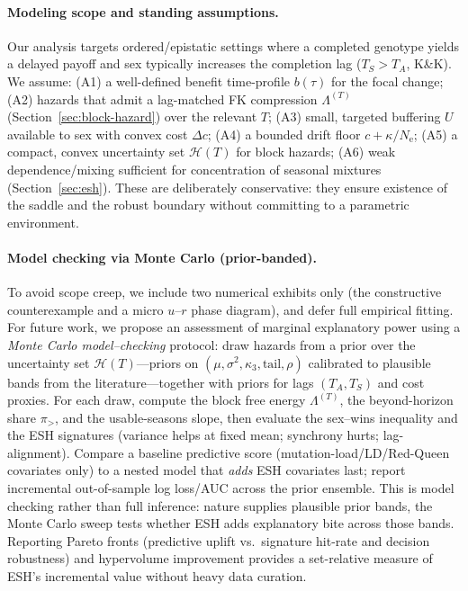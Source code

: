 \documentclass[11pt]{article}
\theoremstyle{upright}
\newcommand{\Ne}{N_{\mathrm{e}}}
\newcommand{\Hset}{\mathcal{H}}
\newcommand{\hazT}[1]{\Lambda^{(#1)}}          %
\begin{document}
\paragraph{Modeling scope and standing assumptions.}
Our analysis targets ordered/epistatic settings where a completed genotype yields a delayed payoff and sex typically increases the completion lag ($T_S>T_A$, K\&K). We assume: (A1) a well-defined benefit time-profile $b(\tau)$ for the focal change; (A2) hazards that admit a lag-matched FK compression $\hazT{T}$ (Section~\ref{sec:block-hazard}) over the relevant $T$; (A3) small, targeted buffering $U$ available to sex with convex cost $\Delta c$; (A4) a bounded drift floor $c+\kappa/\Ne$; (A5) a compact, convex uncertainty set $\mathcal H(T)$ for block hazards; (A6) weak dependence/mixing sufficient for concentration of seasonal mixtures (Section~\ref{sec:esh}). These are deliberately conservative: they ensure existence of the saddle and the robust boundary without committing to a parametric environment.

\paragraph{Model checking via Monte Carlo (prior-banded).}
To avoid scope creep, we include two numerical exhibits only (the constructive counterexample and a micro $u$–$r$ phase diagram), and defer full empirical fitting. For future work, we propose an assessment of marginal explanatory power using a \emph{Monte Carlo model–checking} protocol: draw hazards from a prior over the uncertainty set $\Hset(T)$—priors on $(\mu,\sigma^2,\kappa_3,\text{tail},\rho)$ calibrated to plausible bands from the literature—together with priors for lags $(T_A,T_S)$ and cost proxies. For each draw, compute the block free energy $\Lambda^{(T)}$, the beyond-horizon share $\pi_{>}$, and the usable-seasons slope, then evaluate the sex–wins inequality and the ESH signatures (variance helps at fixed mean; synchrony hurts; lag-alignment). Compare a baseline predictive score (mutation-load/LD/Red-Queen covariates only) to a nested model that \emph{adds} ESH covariates last; report incremental out-of-sample log loss/AUC across the prior ensemble. This is model checking rather than full inference: nature supplies plausible prior bands, the Monte Carlo sweep tests whether ESH adds explanatory bite across those bands.  Reporting Pareto fronts (predictive uplift vs.\ signature hit-rate and decision robustness) and hypervolume improvement provides a set-relative measure of ESH’s incremental value without heavy data curation.
\end{document}
